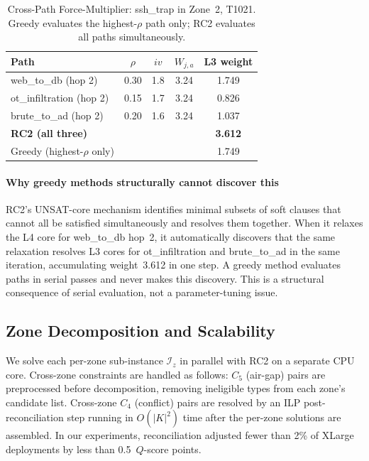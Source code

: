 \documentclass[journal]{IEEEtran}
\newcommand{\qscore}{$Q$-score}
\begin{document}
\begin{table}[t]
\caption{Cross-Path Force-Multiplier: ssh\_trap in Zone~2, T1021.
  Greedy evaluates the highest-$\rho$ path only; RC2 evaluates all
  paths simultaneously.}
\label{tab:forcemult}
\centering
\renewcommand{\arraystretch}{1.2}
\begin{tabular}{lcccc}
\toprule
Path & $\rho$ & $iv$ & $W_{j,a}$ & L3 weight \\
\midrule
web\_to\_db (hop 2)       & 0.30 & 1.8 & 3.24 & 1.749 \\
ot\_infiltration (hop 2)  & 0.15 & 1.7 & 3.24 & 0.826 \\
brute\_to\_ad (hop 2)     & 0.20 & 1.6 & 3.24 & 1.037 \\
\midrule
\textbf{RC2 (all three)} & & & & \textbf{3.612} \\
Greedy (highest-$\rho$ only) & & & & 1.749 \\
\bottomrule
\end{tabular}
\end{table}

\paragraph{Why greedy methods structurally cannot discover this}
RC2's UNSAT-core mechanism identifies minimal subsets of soft clauses
that cannot all be satisfied simultaneously and resolves them
together. When it relaxes the L4 core for web\_to\_db hop~2, it
automatically discovers that the same relaxation resolves L3 cores
for ot\_infiltration and brute\_to\_ad in the same iteration,
accumulating weight~3.612 in one step. A greedy method evaluates
paths in serial passes and never makes this discovery. This is a
structural consequence of serial evaluation, not a parameter-tuning
issue.

\subsection{Zone Decomposition and Scalability}
\label{sec:solver}

We solve each per-zone sub-instance $\mathcal{I}_z$ in parallel
with RC2 on a separate CPU core. Cross-zone constraints are handled
as follows: $C_5$ (air-gap) pairs are preprocessed before
decomposition, removing ineligible types from each zone's candidate
list. Cross-zone $C_4$ (conflict) pairs are resolved by an ILP
post-reconciliation step running in $O(|K|^2)$ time after the
per-zone solutions are assembled. In our experiments, reconciliation
adjusted fewer than 2\% of XLarge deployments by less than
0.5~\qscore{} points.
\end{document}
